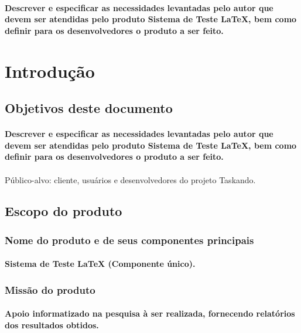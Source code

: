 \documentclass{article}
\begin{document}
		\paragraph{Descrever e especificar as necessidades levantadas pelo autor que devem ser atendidas pelo produto Sistema de Teste LaTeX, bem como definir para os desenvolvedores o produto a ser feito.}


\newpage

\section{Introdução}
	\subsection{Objetivos deste documento}
		\paragraph{Descrever e especificar as necessidades levantadas pelo autor que devem ser atendidas pelo produto Sistema de Teste LaTeX, bem como definir para os desenvolvedores o produto a ser feito.}

\paragraph{}Público-alvo: cliente, usuários e desenvolvedores do projeto Taskando.
	\subsection{Escopo do produto}
		\subsubsection{Nome do produto e de seus componentes principais}
			\paragraph{Sistema de Teste LaTeX (Componente único). }
		\subsubsection{Missão do produto}
			\paragraph{Apoio informatizado na pesquisa à ser realizada, fornecendo relatórios dos resultados obtidos.}
			
\end{document}
